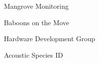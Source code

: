 \item Mangrove Monitoring
\item Baboons on the Move
\item Hardware Development Group
\item Acoustic Species ID
